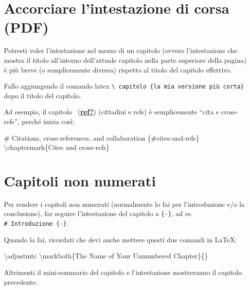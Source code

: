 \documentclass[a4paper, 11pt, nobind]{templates/ociamthesis}
\newenvironment{Shaded}{\begin{snugshade}}{\end{snugshade}}
\newcommand{\FunctionTok}[1]{\textcolor[rgb]{0.00,0.00,0.00}{#1}}
\newcommand{\NormalTok}[1]{#1}
\renewenvironment{Shaded}
{
  \vspace{10pt}%
  \begin{snugshade}%
}{%
  \end{snugshade}%
  \vspace{8pt}%
}
\begin{document}
\hypertarget{accorciare-lintestazione-di-corsa-pdf}{%
\section{Accorciare l'intestazione di corsa (PDF)}\label{accorciare-lintestazione-di-corsa-pdf}}

Potresti voler l'intestazione nel mezzo di un capitolo (ovvero l'intestazione che mostra il titolo all'interno dell'attuale capitolo nella parte superiore della pagina) è più breve (o semplicemente diversa) rispetto al titolo del capitolo effettivo.

Fallo aggiungendo il comando latex \texttt{\textbackslash{}\ capitolo\ \{la\ mia\ versione\ più\ corta\}} dopo il titolo del capitolo.

Ad esempio, il capitolo ~(\protect\hyperlink{ref-ref}{\textbf{ref?}}) (cittadini e refs) è semplicemente ``cita e cross-refs'', perché inizia così:

\begin{Shaded}
\begin{Highlighting}[]
\FunctionTok{\# Citations, cross{-}references, and collaboration \{\#cites{-}and{-}refs\} }
\NormalTok{\textbackslash{}chaptermark\{Cites and cross{-}refs\}}
\end{Highlighting}
\end{Shaded}

\hypertarget{capitoli-non-numerati}{%
\section{Capitoli non numerati}\label{capitoli-non-numerati}}

Per rendere i capitoli non numerati (normalmente lo fai per l'introduzione e/o la conclusione), far seguire l'intestazione del capitolo a \texttt{\{-\}}, ad es. \texttt{\#\ Introduzione\ \{-\}}.

Quando lo fai, ricordati che devi anche mettere questi due comandi in LaTeX:

\begin{Shaded}
\begin{Highlighting}[]
\FunctionTok{\textbackslash{}adjustmtc}
\FunctionTok{\textbackslash{}markboth}\NormalTok{\{The Name of Your Unnumbered Chapter\}\{\}}
\end{Highlighting}
\end{Shaded}

Altrimenti il mini-sommario del capitolo e l'intestazione mostreranno il capitolo precedente.
\end{document}
